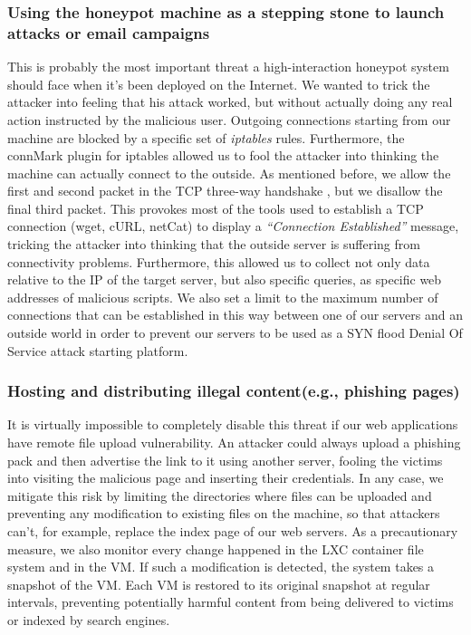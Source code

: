 \subsubsection{Using the honeypot machine as a stepping stone to launch attacks or email campaigns}

 This is probably the most important threat a high-interaction honeypot system should face when it's been deployed on the Internet. We wanted to trick the attacker into feeling that his attack worked, but without actually doing any real action instructed by the malicious user. Outgoing connections starting from our machine are blocked by a specific set of \emph{iptables} rules. Furthermore, the connMark plugin for iptables allowed us to fool the attacker into thinking the machine can actually connect to the outside. As mentioned before, we allow the first and second packet in the TCP three-way handshake , but we disallow the final third packet. This provokes most of the tools used to establish a TCP connection (wget, cURL, netCat) to display a \emph{``Connection Established''} message, tricking the attacker into thinking that the outside server is suffering from connectivity problems. Furthermore, this allowed us to collect not only data relative to the IP of the target server, but also specific queries, as specific web addresses of malicious scripts. We also set a limit to the maximum number of connections that can be established in this way between one of our servers and an outside world in order to prevent our servers to be used as a SYN flood Denial Of Service attack starting platform.

\subsubsection{Hosting and distributing illegal content(e.g., phishing pages)}

 It is virtually impossible to completely disable this threat if our web applications have remote file upload vulnerability. An attacker could always upload a phishing pack and then advertise the link to it using another server, fooling the victims into visiting the malicious page and inserting their credentials. In any case, we mitigate this risk by limiting the directories where files can be uploaded and preventing any modification to existing files on the machine, so that attackers can't, for example, replace the index page of our web servers. As a precautionary measure, we also monitor every change happened in the LXC container file system and in the VM. If such a modification is detected, the system takes a snapshot of the VM. Each VM is restored to its original snapshot at regular intervals, preventing potentially harmful content from being delivered to victims or indexed by search engines.

